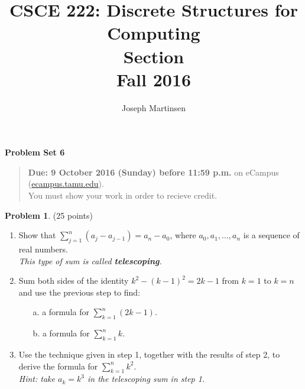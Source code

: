 \documentclass{article}
\title{CSCE 222: Discrete Structures for Computing\\Section \mysectionnumber\\Fall 2016}
\author{Joseph Martinsen}
\theoremstyle{definition}
\newtheorem{problem}{Problem}
\newcommand{\problemset}[1]{\begin{center}\textbf{Problem Set #1}\end{center}}
\newcommand{\duedate}[1]{\begin{quote}\textbf{Due: #1} on eCampus (\url{ecampus.tamu.edu}). \\You must show your work in order to recieve credit.\end{quote}}
\begin{document}
\maketitle

\problemset{6}

\duedate{9 October 2016 (Sunday) before 11:59 p.m.}

\bigskip

\begin{problem} (25 points)
\begin{enumerate}
\item Show that $ \sum_{j=1}^n (a_j-a_{j-1})=a_n-a_0$, where $a_0,a_1,\ldots,a_n$ is a sequence of real numbers.\\ \textit{This type of sum is called \textbf{telescoping}.}
\item Sum both sides of the identity $k^2-(k-1)^2=2k-1$ from $k=1$ to $k=n$ and use the previous step to find:
\begin{enumerate}
\item[a.] a formula for $ \sum_{k=1}^n (2k-1)$.
\item[b.] a formula for $ \sum_{k=1}^n k$.
\end{enumerate}
\item Use the technique given in step 1, together with the results of step 2, to derive the formula for $\displaystyle \sum_{k=1}^n k^2$.\\
\textit{Hint: take $a_k=k^3$ in the telescoping sum in step 1.}
\end{enumerate}
\end{problem}
\end{document}
